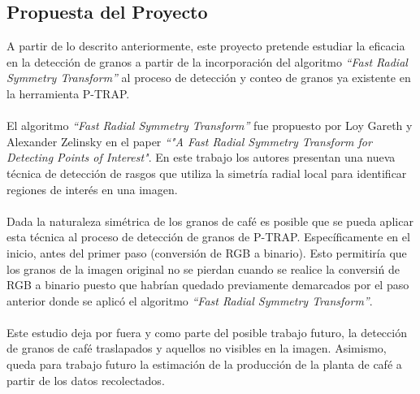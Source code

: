 \subsection{Propuesta del Proyecto}
A partir de lo descrito anteriormente, este proyecto pretende estudiar la eficacia en la detecci\'on de granos a partir de la incorporaci\'on del algoritmo \textit{“Fast Radial Symmetry Transform”}\cite{loyzelinsky} al proceso de detecci\'on y conteo de granos ya existente en la herramienta P-TRAP\cite{ptrap}. 
\\\\
El algoritmo \textit{“Fast Radial Symmetry Transform”} fue propuesto por Loy Gareth y Alexander Zelinsky en el paper \textit{“"A Fast Radial Symmetry Transform for Detecting Points of Interest"}\cite{loyzelinsky}. En este trabajo los autores presentan una nueva t\'ecnica de detecci\'on de rasgos que utiliza la simetr\'ia radial local para identificar regiones de inter\'es en una imagen.
\\\\
Dada la naturaleza sim\'etrica de los granos de caf\'e es posible que se pueda aplicar esta t\'ecnica al proceso de detecci\'on de granos de P-TRAP. Espec\'ificamente en el inicio, antes del primer paso (conversi\'on de RGB a binario). Esto permitir\'ia que los granos de la imagen original no se pierdan cuando se realice la conversi\'n de RGB a binario puesto que habr\'ian quedado previamente demarcados por el paso anterior donde se aplic\'o el algoritmo \textit{“Fast Radial Symmetry Transform”}\cite{loyzelinsky}.
\\\\
Este estudio deja por fuera y como parte del posible trabajo futuro, la detecci\'on de granos de caf\'e traslapados y aquellos no visibles en la imagen. Asimismo, queda para trabajo futuro la estimaci\'on de la producci\'on de la planta de caf\'e a partir de los datos recolectados.

